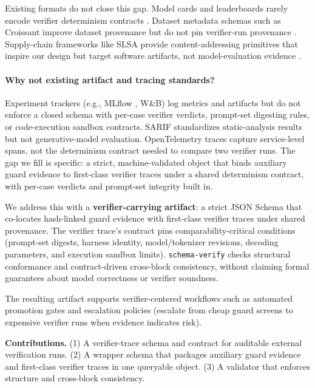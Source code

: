 \documentclass{article} %
\newcommand{\schemaverify}{\texttt{schema-verify}\xspace}
\begin{document}
Existing formats do not close this gap.
Model cards and leaderboards rarely encode verifier determinism contracts \citep{mitchell2019model_cards}.
Dataset metadata schemas such as Croissant improve dataset provenance but do not pin verifier-run
provenance \citep{akhtar2024croissant}.
Supply-chain frameworks like SLSA provide content-addressing primitives that inspire our design but
target software artifacts, not model-evaluation evidence \citep{slsa2023spec}.

\paragraph{Why not existing artifact and tracing standards?}
Experiment trackers (e.g., MLflow \citep{mlflow}, W\&B) log metrics and artifacts but do not enforce a closed
schema with per-case verifier verdicts, prompt-set digesting rules, or code-execution sandbox
contracts.
SARIF \citep{sarif2020} standardizes static-analysis results but not generative-model evaluation.
OpenTelemetry \citep{opentelemetryspec} traces capture service-level spans, not the determinism
contract needed to compare two verifier runs.
The gap we fill is specific: a strict, machine-validated object that binds auxiliary guard evidence
to first-class verifier traces under a shared determinism contract, with per-case verdicts and
prompt-set integrity built in.

We address this with a \textbf{verifier-carrying artifact}: a strict JSON Schema that co-locates
hash-linked guard evidence with first-class verifier traces under shared provenance.
The verifier trace's contract pins comparability-critical conditions (prompt-set digests, harness
identity, model/tokenizer revisions, decoding parameters, and execution sandbox limits).
\schemaverify checks structural conformance and contract-driven cross-block consistency, without
claiming formal guarantees about model correctness or verifier soundness.

The resulting artifact supports verifier-centered workflows such as automated promotion gates and
escalation policies (escalate from cheap guard screens to expensive verifier runs when evidence
indicates risk).

\textbf{Contributions.}
(1) A verifier-trace schema and contract for auditable external verification runs.
(2) A wrapper schema that packages auxiliary guard evidence and first-class verifier traces in one
queryable object.
(3) A validator that enforces structure and cross-block consistency.
\end{document}
